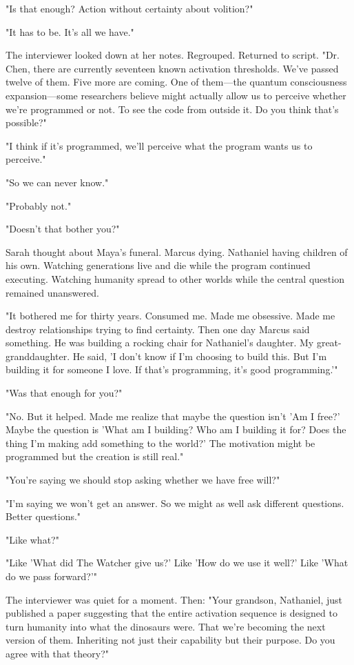 "Is that enough? Action without certainty about volition?"

"It has to be. It's all we have."

The interviewer looked down at her notes. Regrouped. Returned to script. "Dr. Chen, there are currently seventeen known activation thresholds. We've passed twelve of them. Five more are coming. One of them—the quantum consciousness expansion—some researchers believe might actually allow us to perceive whether we're programmed or not. To see the code from outside it. Do you think that's possible?"

"I think if it's programmed, we'll perceive what the program wants us to perceive."

"So we can never know."

"Probably not."

"Doesn't that bother you?"

Sarah thought about Maya's funeral. Marcus dying. Nathaniel having children of his own. Watching generations live and die while the program continued executing. Watching humanity spread to other worlds while the central question remained unanswered.

"It bothered me for thirty years. Consumed me. Made me obsessive. Made me destroy relationships trying to find certainty. Then one day Marcus said something. He was building a rocking chair for Nathaniel's daughter. My great-granddaughter. He said, 'I don't know if I'm choosing to build this. But I'm building it for someone I love. If that's programming, it's good programming.'"

"Was that enough for you?"

"No. But it helped. Made me realize that maybe the question isn't 'Am I free?' Maybe the question is 'What am I building? Who am I building it for? Does the thing I'm making add something to the world?' The motivation might be programmed but the creation is still real."

"You're saying we should stop asking whether we have free will?"

"I'm saying we won't get an answer. So we might as well ask different questions. Better questions."

"Like what?"

"Like 'What did The Watcher give us?' Like 'How do we use it well?' Like 'What do we pass forward?'"

The interviewer was quiet for a moment. Then: "Your grandson, Nathaniel, just published a paper suggesting that the entire activation sequence is designed to turn humanity into what the dinosaurs were. That we're becoming the next version of them. Inheriting not just their capability but their purpose. Do you agree with that theory?"

